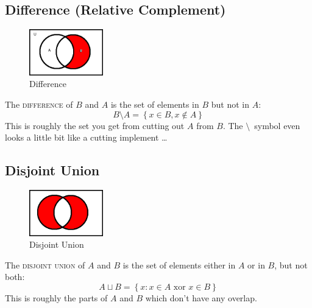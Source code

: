 \documentclass[a4paper,12pt,oneside,leqno]{scrartcl}%
\theoremstyle{definition}
\newcommand{\terminus}[1]{\textsc{#1}}
\begin{document}
\subsection{Difference (Relative Complement)}
\begin{figure}
\includegraphics[height=2cm]{set-base-lettered-difference}
\vspace{-20pt}
\caption{Difference}\label{fig:sets-difference}
\vspace{-20pt}
\end{figure}
The \terminus{difference} of $B$ and $A$ is the set of elements in $B$ but not in $A$:  
\begin{equation}
B \setminus A = \left\{ x \in B, x \not\in A\right\}
\end{equation}
This is roughly the set you get from cutting out  $A$ from $B$. The $\setminus$~symbol even looks a little bit like a cutting implement \ldots

\subsection{Disjoint Union}
\begin{figure}
\includegraphics[height=2cm]{set-base-lettered-symmetricdifference}
\vspace{-20pt}
\caption{Disjoint Union}\label{fig:sets-disjointunion}
\vspace{-20pt}
\end{figure}
The \terminus{disjoint union} of $A$ and $B$ is the set of elements either in $A$ or in $B$, but not both: 
\begin{equation}
A \sqcup B = \left\{x: x\in A \text{ xor } x \in B\right\}%
\end{equation}
This is roughly the parts of $A$ and $B$ which don't have any overlap.
\end{document}
